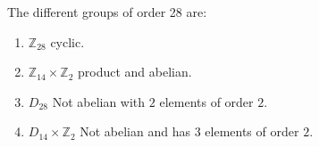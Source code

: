 \documentclass[10pt]{article}
\newcommand{\sk}{\vskip 10mm}
\newcommand{\bb}[1]{\mathbb{#1}}
\theoremstyle{plain}
\theoremstyle{remark}
\begin{document}
The different groups of order 28 are:
\begin{enumerate}
\item $\bb{Z}_{28}$ cyclic.
\item $\bb{Z}_{14}\times \bb{Z}_2$ product and abelian.
\item $D_{28}$ Not abelian with $2$ elements of order $2$.
\item $D_{14}\times\bb{Z}_2$ Not abelian and has $3$ elements of order
  $2$.
\end{enumerate}

\sk

\end{document}
